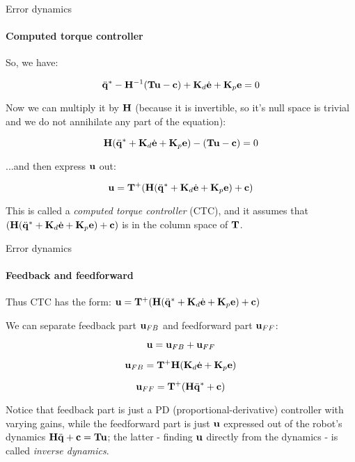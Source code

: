 \documentclass{beamer}
\begin{document}
\begin{frame}{Error dynamics}
\framesubtitle{Computed torque controller}
\begin{flushleft}

So, we have:

\begin{equation}
\ddot{\mathbf{q}}^* - \mathbf{H}^{-1} (\mathbf{T}\mathbf{u} - \mathbf{c}) + \mathbf{K}_d\dot{\mathbf{e}} + \mathbf{K}_p\mathbf{e} = 0
\end{equation}

Now we can multiply it by $\mathbf{H}$ (because it is invertible, so it's null space is trivial and we do not annihilate any part of the equation):

\begin{equation}
\mathbf{H}(\ddot{\mathbf{q}}^* + \mathbf{K}_d\dot{\mathbf{e}} + \mathbf{K}_p\mathbf{e}) - (\mathbf{T}\mathbf{u} - \mathbf{c}) = 0
\end{equation}

...and then express $\mathbf{u}$ out:

\begin{equation}
\label{eq:CTC}
\mathbf{u} = \mathbf{T}^+(\mathbf{H}(\ddot{\mathbf{q}}^* + \mathbf{K}_d\dot{\mathbf{e}} + \mathbf{K}_p\mathbf{e}) + \mathbf{c})
\end{equation}

This is called a \emph{computed torque controller} (CTC), and it assumes that $(\mathbf{H}(\ddot{\mathbf{q}}^* + \mathbf{K}_d\dot{\mathbf{e}} + \mathbf{K}_p\mathbf{e}) + \mathbf{c})$ is in the column space of $\mathbf{T}$.

\end{flushleft}
\end{frame}



\begin{frame}{Error dynamics}
\framesubtitle{Feedback and feedforward}
\begin{flushleft}

Thus CTC has the form: $\mathbf{u} = \mathbf{T}^+(\mathbf{H}(\ddot{\mathbf{q}}^* + \mathbf{K}_d\dot{\mathbf{e}} + \mathbf{K}_p\mathbf{e}) + \mathbf{c})$

\bigskip

We can separate feedback part $\mathbf{u}_{FB}$ and feedforward part $\mathbf{u}_{FF}$:

\begin{equation}
\mathbf{u} = \mathbf{u}_{FB} + \mathbf{u}_{FF}
\end{equation}

\begin{equation}
\mathbf{u}_{FB} = \mathbf{T}^+\mathbf{H}(\mathbf{K}_d\dot{\mathbf{e}} + \mathbf{K}_p\mathbf{e})
\end{equation}

\begin{equation}
\mathbf{u}_{FF} = \mathbf{T}^+(\mathbf{H}\ddot{\mathbf{q}}^* + \mathbf{c})
\end{equation}

Notice that feedback part is just a PD (proportional-derivative) controller with varying gains, while the feedforward part is just $\mathbf{u}$ expressed out of the robot's dynamics $\mathbf{H} \ddot{\mathbf{q}} + \mathbf{c} = \mathbf{T}\mathbf{u}$; the latter - finding  $\mathbf{u}$ directly from the dynamics - is called \emph{inverse dynamics}.
\end{flushleft}
\end{frame}
\end{document}
